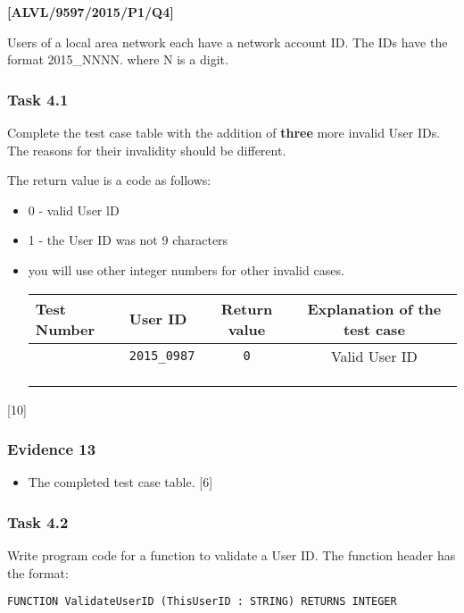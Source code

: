\item \textbf{{[}ALVL/9597/2015/P1/Q4{]} }

Users of a local area network each have a network account ID. The
IDs have the format 2015\_NNNN. where N is a digit. 

\subsubsection*{Task 4.1}

Complete the test case table with the addition of \textbf{three} more
invalid User IDs. The reasons for their invalidity should be different. 

The return value is a code as follows: 
\begin{itemize}
\item 0 - valid User lD 
\item 1 - the User ID was not 9 characters 
\item you will use other integer numbers for other invalid cases. 
\begin{center}
\begin{tabular}{|>{\centering}p{}|>{\centering}p{}|c|c|}
\hline 
Test Number & User ID & Return value & Explanation of the test case\tabularnewline
\hline 
1 & \texttt{2015\_0987} & \texttt{0} & Valid User ID\tabularnewline
\hline 
2 &  &  & \tabularnewline
\hline 
3 &  &  & \tabularnewline
\hline 
4 &  &  & \tabularnewline
\hline 
\end{tabular}
\par\end{center}

\end{itemize}
\hfill{}{[}10{]}

\subsubsection*{Evidence 13}
\begin{itemize}
\item The completed test case table. \hfill{}{[}6{]}
\end{itemize}

\subsubsection*{Task 4.2}

Write program code for a function to validate a User ID. The function
header has the format: 
\begin{center}
\texttt{FUNCTION ValidateUserID (ThisUserID : STRING) RETURNS INTEGER }
\par\end{center}

